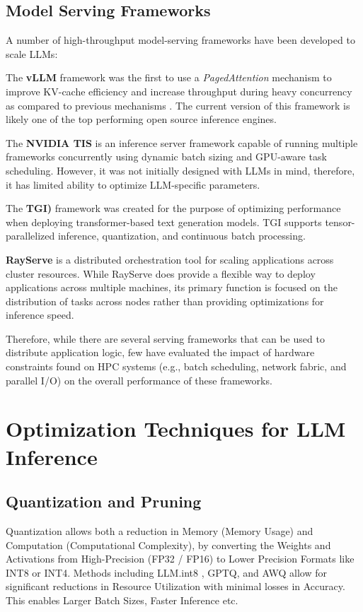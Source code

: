 \subsection{Model Serving Frameworks}

A number of high-throughput model-serving frameworks have been developed to scale \acp{LLM}:

The \textbf{\ac{vLLM}} framework was the first to use a \textit{PagedAttention} mechanism to improve \ac{KV}-cache efficiency and increase throughput during heavy concurrency as compared to previous mechanisms \cite{kwon2023vllm}. The current version of this framework is likely one of the top performing open source inference engines.

The \textbf{NVIDIA \ac{TIS}} is an inference server framework capable of running multiple frameworks concurrently using dynamic batch sizing and GPU-aware task scheduling. However, it was not initially designed with LLMs in mind, therefore, it has limited ability to optimize LLM-specific parameters.

The \textbf{\ac{TGI})} framework was created for the purpose of optimizing performance when deploying transformer-based text generation models. \ac{TGI} supports tensor-parallelized inference, quantization, and continuous batch processing.

\textbf{RayServe} is a distributed orchestration tool for scaling applications across cluster resources. While RayServe does provide a flexible way to deploy applications across multiple machines, its primary function is focused on the distribution of tasks across nodes rather than providing optimizations for inference speed. 

Therefore, while there are several serving frameworks that can be used to distribute application logic, few have evaluated the impact of hardware constraints found on HPC systems (e.g., batch scheduling, network fabric, and parallel I/O) on the overall performance of these frameworks.

\section{Optimization Techniques for LLM Inference}

\subsection{Quantization and Pruning}

Quantization allows both a reduction in Memory (Memory Usage) and Computation (Computational Complexity), by converting the Weights and Activations from High-Precision (\ac{FP32} / \ac{FP16}) to Lower Precision Formats like \ac{INT8} or \ac{INT4}. Methods including LLM.int8 \cite{dettmers2022int8}, \ac{GPTQ}, and \ac{AWQ} allow for significant reductions in Resource Utilization with minimal losses in Accuracy. This enables Larger Batch Sizes, Faster Inference etc.

